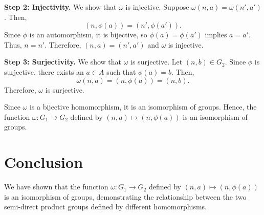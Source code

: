 \documentclass[12pt]{amsart}
\theoremstyle{definition}
\numberwithin{equation}{section}
\begin{document}
\begin{exercise}{4}
    \noindent \textbf{Step 2: Injectivity.} We show that \(\omega \) is injective.
    Suppose \(\omega(n, a) = \omega(n', a')\). Then,
    \[(n, \phi(a)) = (n', \phi(a')).\]
    Since \(\phi \) is an automorphism, it is bijective, so \(\phi(a) = \phi(a')\) implies \(a = a'\). Thus, \(n = n'\). Therefore, \((n, a) = (n', a')\) and \(\omega \) is injective.

    \noindent \textbf{Step 3: Surjectivity.} We show that \(\omega \) is surjective.
    Let \((n, b) \in G_2\). Since \(\phi \) is surjective, there exists an \(a \in A\) such that \(\phi(a) = b\). Then,
    \[
    \omega(n, a) = (n, \phi(a)) = (n, b).
    \]
    Therefore, \(\omega \) is surjective.

    Since \(\omega \) is a bijective homomorphism, it is an isomorphism of groups. Hence, the function \(\omega : G_1 \rightarrow G_2\) defined by \((n,a) \mapsto (n, \phi(a))\) is an isomorphism of groups.

    \section*{Conclusion}
    We have shown that the function \(\omega : G_1 \rightarrow G_2\) defined by \((n,a) \mapsto (n, \phi(a))\) is an isomorphism of groups, demonstrating the relationship between the two semi-direct product groups defined by different homomorphisms.

\end{exercise}
\newpage
\end{document}
